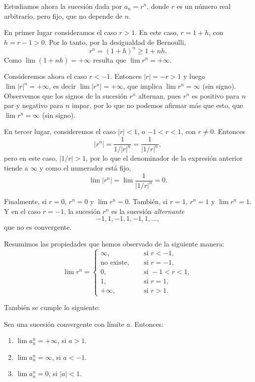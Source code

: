 Estudiamos ahora la sucesión dada por $a_n = r^n$, donde $r$ es un número real arbitrario, pero fijo, que no depende de $n$.

En primer lugar consideramos el caso $r>1$. En este caso, $r = 1+h$, con $h=r-1>0$. Por lo tanto, por la desigualdad de Bernoulli,
\[ r^n = (1+h)^n \ge 1 + nh.\]
Como $\lim (1+nh) = +\infty$ resulta que $\lim r^n = +\infty$.

Consideremos ahora el caso $r<-1$. Entonces $|r|=-r > 1$ y luego $\lim |r|^n = +\infty$, es decir $\lim | r^n | = +\infty$, que implica $\lim r^n = \infty$ (sin signo). Observemos que los signos de la sucesión $r^n$ alternan, pues $r^n$ es positivo para $n$ par y negativo para $n$ impar, por lo que no podemos afirmar más que esto, que $\lim r^n = \infty$ (sin signo).

En tercer lugar, consideremos el caso $|r|<1$, o $-1<r<1$, con $r\neq 0$.
Entonces 
\[
|r^n| = \frac1{1/|r|^n} = \frac1{\big|1/r\big|^n},
\]
pero en este caso, $\big|1/r\big|>1$, por lo que el denominador de la expresión anterior tiende a $\infty$ y como el numerador está fijo, 
\[
\lim |r^n| = \lim \frac1{\big|1/r\big|^n} = 0.
\]

Finalmente, si $r=0$, $r^n=0$ y $\lim r^n = 0$. También, si $r=1$, $r^n=1$ y $\lim r^n = 1$.
Y en el caso $r=-1$, la sucesión $r^n$ es la sucesión \emph{alternante}
\[
-1,1,-1,1,-1,1,\dots,
\]
que no es convergente.

Resumimos las propiedades que hemos observado de la siguiente manera:
\[
\lim r^n =
\begin{cases}
    \infty,           \quad&\text{ si \ }r < -1,\\
    \text{no existe}, \quad&\text{ si \ }r=-1,\\
    0,                \quad&\text{ si \ }-1<r<1,\\
    1,                \quad&\text{ si \ }r=1,\\
    +\infty,          \quad&\text{ si \ }r>1.
\end{cases}
\]

También se cumple lo siguiente:

\begin{proposition}
    Sea \sucan una sucesión convergente con límite $a$.
Entonces:
\begin{enumerate}
    \item $\lim a_n^n = +\infty$, si $a>1$.
    \item $\lim a_n^n = \infty$, si $a<-1$.
    \item $\lim a_n^n = 0$, si $|a|<1$.
\end{enumerate}
\end{proposition}

